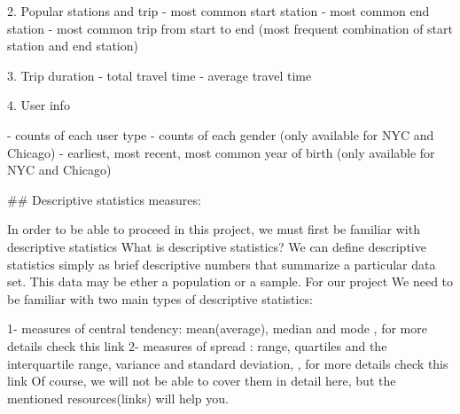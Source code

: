 2. Popular stations and trip
  - most common start station
  - most common end station
  - most common trip from start to end (most frequent combination of start station and end station)

3. Trip duration
  - total travel time
  - average travel time

4. User info

  - counts of each user type
  - counts of each gender (only available for NYC and Chicago)
  - earliest, most recent, most common year of birth (only available for NYC and Chicago)

## Descriptive statistics measures: 

In order to be able to proceed in this project, we must first be familiar with descriptive statistics
What is descriptive statistics?
We can define descriptive statistics simply as brief descriptive numbers that summarize a particular data set. This data may be ether a population or a sample.
For our project We need to be familiar with two main types of descriptive statistics:

1- measures of central tendency: mean(average), median and mode , 
    for more details check this link
2- measures of spread :  range, quartiles and the interquartile range, 
     variance and standard deviation, , for more details check this link
Of course, we will not be able to cover them in detail here, but the mentioned resources(links) will help you.